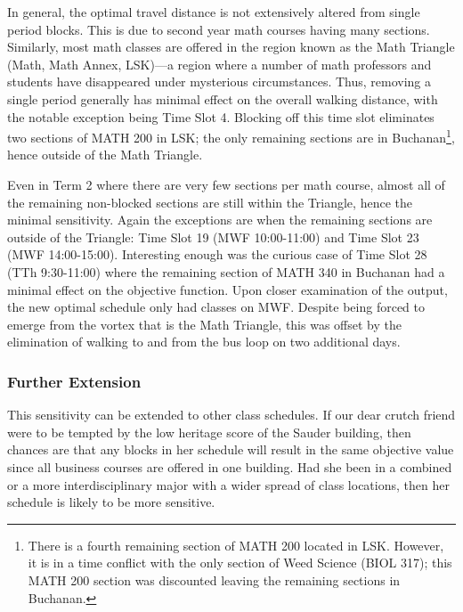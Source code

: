 \documentclass[11pt, oneside]{article}   	%
\begin{document}
In general, the optimal travel distance is not extensively altered from single period blocks. This is due to second year math courses having many sections. Similarly, most math classes are offered in the region known as the Math Triangle (Math, Math Annex, LSK)---a region where a number of math professors and students have disappeared under mysterious circumstances. Thus, removing a single period generally has minimal effect on the overall walking distance, with the notable exception being Time Slot 4. Blocking off this time slot eliminates two sections of MATH 200 in LSK; the only remaining sections are in Buchanan\footnote{There is a fourth remaining section of MATH 200 located in LSK. However, it is in a time conflict with the only section of Weed Science (BIOL 317); this MATH 200 section was discounted leaving the remaining sections in Buchanan.}, hence outside of the Math Triangle.

Even in Term 2 where there are very few sections per math course, almost all of the remaining non-blocked sections are still within the Triangle, hence the minimal sensitivity. Again the exceptions are when the remaining sections are outside of the Triangle: Time Slot 19 (MWF 10:00-11:00) and Time Slot 23 (MWF 14:00-15:00). Interesting enough was the curious case of Time Slot 28 (TTh 9:30-11:00) where the remaining section of MATH 340 in Buchanan had a minimal effect on the objective function. Upon closer examination of the output, the new optimal schedule only had classes on MWF. Despite being forced to emerge from the vortex that is the Math Triangle, this was offset by the elimination of walking to and from the bus loop on two additional days.

\subsubsection*{Further Extension}

This sensitivity can be extended to other class schedules. If our dear crutch friend were to be tempted by the low heritage score of the Sauder building, then chances are that any blocks in her schedule will result in the same objective value since all business courses are offered in one building. Had she been in a combined or a more interdisciplinary major with a wider spread of class locations, then her schedule is likely to be more sensitive.


\end{document}
